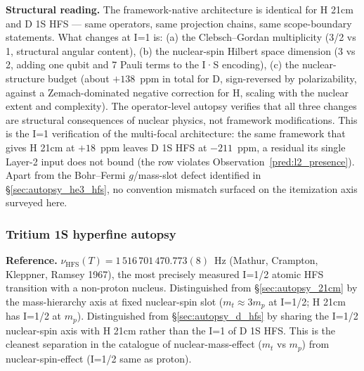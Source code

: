\documentclass[11pt]{article}
\begin{document}
\textbf{Structural reading.}  The framework-native architecture is
identical for H 21cm and D 1S HFS --- same operators, same projection
chains, same scope-boundary statements.  What changes at I=1 is:
(a) the Clebsch--Gordan multiplicity (3/2 vs 1, structural angular
content), (b) the nuclear-spin Hilbert space dimension (3 vs 2,
adding one qubit and 7 Pauli terms to the I·S encoding), (c) the
nuclear-structure budget (about $+138$~ppm in total for D, sign-reversed
by polarizability, against a Zemach-dominated negative correction for
H, scaling with the nuclear extent and complexity).  The operator-level autopsy verifies
that all three changes are structural consequences of nuclear physics,
not framework modifications.  This is the I=1 verification of the
multi-focal architecture: the same framework that gives H 21cm at
$+18$~ppm leaves D 1S HFS at $-211$~ppm, a residual its single Layer-2
input does not bound (the row violates
Observation~\ref{pred:l2_presence}).  Apart from the Bohr--Fermi
$g$/mass-slot defect identified in \S\ref{sec:autopsy_he3_hfs}, no
convention mismatch surfaced on the itemization axis surveyed here.

\subsubsection{Tritium 1S hyperfine autopsy}
\label{sec:autopsy_t_hfs}

\textbf{Reference.}  $\nu_\text{HFS}(T) = 1\,516\,701\,470.773(8)$~Hz
(Mathur, Crampton, Kleppner, Ramsey 1967), the most precisely measured I=1/2 atomic HFS transition
with a non-proton nucleus.  Distinguished from \S\ref{sec:autopsy_21cm}
by the mass-hierarchy axis at fixed nuclear-spin slot
($m_t \approx 3 m_p$ at I=1/2; H 21cm has I=1/2 at $m_p$).
Distinguished from \S\ref{sec:autopsy_d_hfs} by sharing the I=1/2
nuclear-spin axis with H 21cm rather than the I=1 of D 1S HFS.  This
is the cleanest separation in the catalogue of nuclear-mass-effect
($m_t$ vs $m_p$) from nuclear-spin-effect (I=1/2 same as proton).
\end{document}
